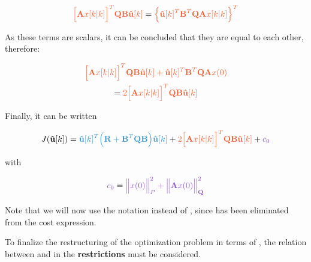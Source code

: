 \begin{equation}
	\orange{\Big[ \mathbf{A}x[k|k] \Big]^T \mathbf{Q} \mathbf{B} \mathbf{\hat{u}}[k]} = 
	\orange{\Big\{ \mathbf{\hat{u}}[k]^T \mathbf{B}^T \mathbf{Q} \mathbf{A} x[k|k] \Big\}^T}
\end{equation}

As these terms are scalars, it can be concluded that they are equal to each other, therefore:

\noindent
\begin{equation}
	\begin{gathered}
		\orange{\Big[ \mathbf{A}x[k|k] \Big]^T \mathbf{Q} \mathbf{B} \mathbf{\hat{u}}[k] + \mathbf{\hat{u}}[k]^T \mathbf{B}^T \mathbf{Q} \mathbf{A} x(0)} \\
		= \orange{2\Big[ \mathbf{A}x[k|k] \Big]^T \mathbf{Q} \mathbf{B} \mathbf{\hat{u}}[k]}
	\end{gathered}
\end{equation}

Finally, it can be written

\noindent
\begin{equation}
	\begin{gathered}
		J(\mathbf{\hat{u}}[k]) = 
			\blue{\mathbf{\hat{u}}[k]^T \Big(\mathbf{R} + \mathbf{B}^T \mathbf{Q} \mathbf{B} \Big) \mathbf{\hat{u}}[k]} + 
			\orange{2 \Big[ \mathbf{A}x[k|k] \Big]^T \mathbf{Q} \mathbf{B} \mathbf{\hat{u}}[k]} + 
			\purple{c_0}
	\end{gathered}
\end{equation}

with

\noindent
\begin{equation}
	\purple{ c_0 } = 
	\purple{ \norma{x(0)}{P} + \norma{\mathbf{A} x(0)}{\mathbf{Q}} }
\end{equation}


Note that we will now use the notation  instead of , 
since  has been eliminated from the cost expression. 


To finalize the restructuring of the optimization problem in terms of , the relation between 
 and  in the \textbf{restrictions} must be considered.

